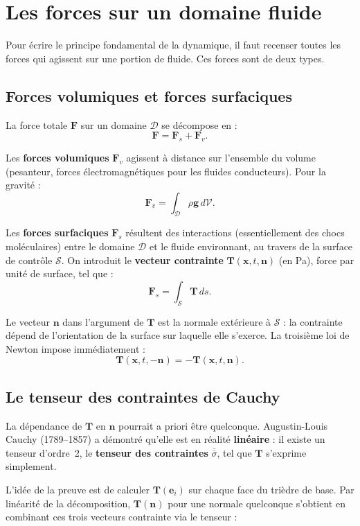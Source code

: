\documentclass[11pt,a4paper]{report}
\newcommand{\ten}[1]{\overline{\overline{#1}}}   %
\begin{document}
\section{Les forces sur un domaine fluide}

Pour écrire le principe fondamental de la dynamique, il faut recenser toutes les
forces qui agissent sur une portion de fluide. Ces forces sont de deux types.

\subsection{Forces volumiques et forces surfaciques}

La force totale $\bm{F}$ sur un domaine $\mathcal{D}$ se décompose en :
\[
    \bm{F} = \bm{F}_s + \bm{F}_v.
\]

Les \textbf{forces volumiques} $\bm{F}_v$ agissent à distance sur l'ensemble du
volume (pesanteur, forces électromagnétiques pour les fluides conducteurs). Pour
la gravité :
\[
    \bm{F}_v = \int_{\mathcal{D}} \rho\bm{g}\,d\mathcal{V}.
\]

Les \textbf{forces surfaciques} $\bm{F}_s$ résultent des interactions (essentiellement
des chocs moléculaires) entre le domaine $\mathcal{D}$ et le fluide environnant, au
travers de la surface de contrôle $\mathcal{S}$. On introduit le \textbf{vecteur
contrainte} $\bm{T}(\bm{x},t,\bm{n})$ (en Pa), force par unité de surface, tel
que :
\[
    \bm{F}_s = \int_{\mathcal{S}} \bm{T}\,ds.
\]

Le vecteur $\bm{n}$ dans l'argument de $\bm{T}$ est la normale extérieure à $\mathcal{S}$ :
la contrainte dépend de l'orientation de la surface sur laquelle elle s'exerce. La
troisième loi de Newton impose immédiatement :
\[
    \bm{T}(\bm{x},t,-\bm{n}) = -\bm{T}(\bm{x},t,\bm{n}).
\]

\subsection{Le tenseur des contraintes de Cauchy}

La dépendance de $\bm{T}$ en $\bm{n}$ pourrait a priori être quelconque. Augustin-Louis
Cauchy (1789--1857) a démontré qu'elle est en réalité \textbf{linéaire} : il existe
un tenseur d'ordre~2, le \textbf{tenseur des contraintes} $\ten{\sigma}$, tel que
$\bm{T}$ s'exprime simplement.

L'idée de la preuve est de calculer $\bm{T}(\bm{e}_i)$ sur chaque face du trièdre
de base. Par linéarité de la décomposition, $\bm{T}(\bm{n})$ pour une normale
quelconque s'obtient en combinant ces trois vecteurs contrainte via le tenseur :
\end{document}
